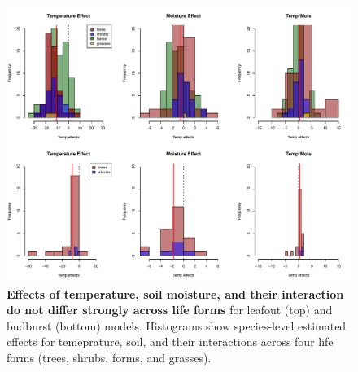 \documentclass{article}
\begin{document}
 \begin{figure}[h]
\centering
 \includegraphics{../../Analyses/soilmoisture/figures/histbbloform_spef.pdf}
 \caption{\textbf{Effects of temperature, soil moisture, and their interaction do not differ strongly across life forms} for leafout (top) and budburst (bottom) models. Histograms show species-level estimated effects for temeprature, soil, and their interactions across four life forms (trees, shrubs, forms, and grasses).}
 \label{fig:forms}
 \end{figure}
\end{document}
